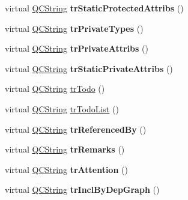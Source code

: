 \begin{DoxyCompactItemize}
virtual \mbox{\hyperlink{class_q_c_string}{Q\+C\+String}} {\bfseries tr\+Static\+Protected\+Attribs} ()
\item 
\mbox{\label{class_translator_vietnamese_ac45e08ada20f1234a3512df26a494119}} 
virtual \mbox{\hyperlink{class_q_c_string}{Q\+C\+String}} {\bfseries tr\+Private\+Types} ()
\item 
\mbox{\label{class_translator_vietnamese_a500a43a9f7ebce5860a9b384b697cd17}} 
virtual \mbox{\hyperlink{class_q_c_string}{Q\+C\+String}} {\bfseries tr\+Private\+Attribs} ()
\item 
\mbox{\label{class_translator_vietnamese_ad7277ab44b1d901d98584544ee49f96f}} 
virtual \mbox{\hyperlink{class_q_c_string}{Q\+C\+String}} {\bfseries tr\+Static\+Private\+Attribs} ()
\item 
virtual \mbox{\hyperlink{class_q_c_string}{Q\+C\+String}} \mbox{\hyperlink{class_translator_vietnamese_a3df6262687d82cdc1f1b01c48a7df82c}{tr\+Todo}} ()
\item 
virtual \mbox{\hyperlink{class_q_c_string}{Q\+C\+String}} \mbox{\hyperlink{class_translator_vietnamese_a1b38dbdc9390ca10d8b54b9f29b4e57e}{tr\+Todo\+List}} ()
\item 
\mbox{\label{class_translator_vietnamese_abab2fdf9850e547b0aac978ee377b645}} 
virtual \mbox{\hyperlink{class_q_c_string}{Q\+C\+String}} {\bfseries tr\+Referenced\+By} ()
\item 
\mbox{\label{class_translator_vietnamese_ab6cd72309022bb514e686269d7a7789a}} 
virtual \mbox{\hyperlink{class_q_c_string}{Q\+C\+String}} {\bfseries tr\+Remarks} ()
\item 
\mbox{\label{class_translator_vietnamese_a7ff03fe81d19e98bc64565d43d93bf91}} 
virtual \mbox{\hyperlink{class_q_c_string}{Q\+C\+String}} {\bfseries tr\+Attention} ()
\item 
\mbox{\label{class_translator_vietnamese_a03ecc46d052bd92e5f50e7b9d83e09a1}} 
virtual \mbox{\hyperlink{class_q_c_string}{Q\+C\+String}} {\bfseries tr\+Incl\+By\+Dep\+Graph} ()
\item 

\end{DoxyCompactItemize}
